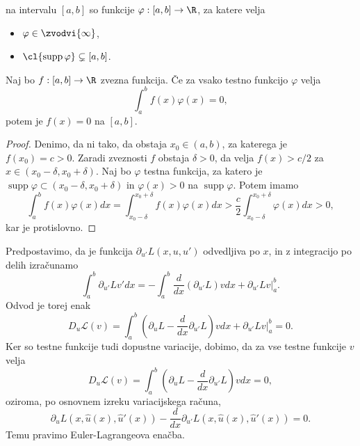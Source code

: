 \begin{definicija}
   na intervalu $[a, b]$ so funkcije $\varphi:[a,b] \to
  \R$, za katere velja
  \begin{itemize}
  \item $\varphi \in \zvodvi{\infty}$,
  \item $\cl{\operatorname{supp} \varphi} \subsetneq [a,b]$.
  \end{itemize}
\end{definicija}


\begin{izrek}
  Naj bo $f: [a,b] \to \R$ zvezna funkcija.
  Če za vsako testno funkcijo $\varphi$ velja
  \[
	\int_a^b f(x) \varphi(x) = 0,
  \]
  potem je $f(x) = 0$ na $[a,b]$.
\end{izrek}

\begin{proof}
  Denimo, da ni tako, da obstaja $x_0 \in (a, b)$, za katerega je $f(x_0) = c>
  0$.
  Zaradi zveznosti $f$ obstaja $\delta > 0$, da velja $f(x) > c/2$ za $x \in
  (x_0 - \delta, x_0 + \delta)$.
  Naj bo $\varphi$ testna funkcija, za katero je $\operatorname{supp} \varphi
  \subset (x_0 - \delta, x_0 + \delta)$ in $\varphi(x) > 0$ na
  $\operatorname{supp} \varphi$.
  Potem imamo
  \[
	\int_a^b f(x) \varphi(x) dx
	= \int_{x_0 - \delta}^{x_0 + \delta} f(x) \varphi(x) dx
	> \frac{c}{2} \int_{x_0 - \delta}^{x_0 + \delta} \varphi(x) dx > 0,
  \]
  kar je protislovno.
\end{proof}


Predpostavimo, da je funkcija $\partial_{u'} L(x, u, u')$ odvedljiva po $x$, in
z integracijo po delih izračunamo
\[
  \int_a^b \partial_{u'} L v' dx
  = - \int_a^b \frac{d}{dx} \left( \partial_{u'} L \right) v dx
  + \left. \partial_{u'} L v \right|_a^b.
\]
Odvod je torej enak
\[
  D_u \mathcal{L}(v) = \int_a^b \left( \partial_u L - \frac{d}{dx} \partial_{u'}
	L\right) v dx + \left. \partial_{u'} L v \right|_a^b
  = 0.
\]
Ker so testne funkcije tudi dopustne variacije, dobimo, da za vse testne
funkcije $v$ velja
\[
  D_u \mathcal{L}(v) = \int_a^b \left( \partial_u L - \frac{d}{dx} \partial_{u'}
	L\right) v dx
  = 0,
\]
oziroma, po osnovnem izreku variacijskega računa,
\[
  \partial_u L(x, \hat{u}(x), \hat{u}'(x)) - \frac{d}{dx} \partial_{u'} L(x,
  \hat{u}(x), \hat{u}'(x)) = 0.
\]
Temu pravimo Euler-Lagrangeova enačba.

